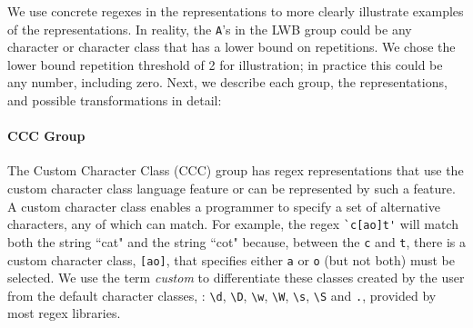 We use concrete regexes in the representations to more clearly illustrate examples of the representations. In reality, the \verb!A!'s in the LWB group could be any character or character class that has a lower bound on repetitions. We chose the lower bound repetition threshold of  2 for illustration; in practice this could be any number, including zero.
Next, we describe each group, the representations, and possible transformations in detail:

\paragraph{CCC Group}
The Custom Character Class (CCC) group has regex representations that use the custom character class language feature or can be represented by such a feature.
 A custom character class enables a programmer to specify a set of alternative characters, any of which can match.  For example, the regex \verb!`c[ao]t'! will match both the string ``cat" and the string ``cot" because, between the \verb!c! and \verb!t!, there is a custom character class, \verb![ao]!, that specifies either \verb!a! or \verb!o! (but not both) must be selected.  We use the term \emph{custom} to differentiate these classes created by the user from the default character classes, : \verb!\d!, \verb!\D!, \verb!\w!, \verb!\W!, \verb!\s!, \verb!\S! and \verb!.!,  provided by most regex libraries.

